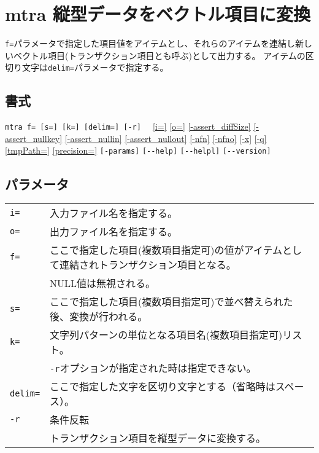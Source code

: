 
%

\section{mtra 縦型データをベクトル項目に変換\label{sect:mtra}}
\verb|f=|パラメータで指定した項目値をアイテムとし、それらのアイテムを連結し新しいベクトル項目(トランザクション項目とも呼ぶ)として出力する。
アイテムの区切り文字は\verb|delim=|パラメータで指定する。

\subsection*{書式}
\verb|mtra f= [s=] [k=] [delim=] [-r]  | 
\hyperref[sect:option_i]{[i=]}
\hyperref[sect:option_o]{[o=]}
\hyperref[sect:option_assert_diffSize]{[-assert\_diffSize]}
\hyperref[sect:option_assert_nullkey]{[-assert\_nullkey]}
\hyperref[sect:option_assert_nullin]{[-assert\_nullin]}
\hyperref[sect:option_assert_nullout]{[-assert\_nullout]}
\hyperref[sect:option_nfn]{[-nfn]} 
\hyperref[sect:option_nfno]{[-nfno]}  
\hyperref[sect:option_x]{[-x]}
\hyperref[sect:option_q]{[-q]}
\hyperref[sect:option_option_tmppath]{[tmpPath=]}
\hyperref[sect:option_precision]{[precision=]}
\verb|[-params]|
\verb|[--help]|
\verb|[--helpl]|
\verb|[--version]|\\

\subsection*{パラメータ}
\begin{table}[htbp]
{\small
\begin{tabular}{ll}
\verb|i=|        & 入力ファイル名を指定する。\\
\verb|o=|        & 出力ファイル名を指定する。\\
\verb|f=|        & ここで指定した項目(複数項目指定可)の値がアイテムとして連結されトランザクション項目となる。\\
                 & NULL値は無視される。\\
\verb|s=|        & ここで指定した項目(複数項目指定可)で並べ替えられた後、変換が行われる。\\
\verb|k=|        & 文字列パターンの単位となる項目名(複数項目指定可)リスト。\\
                 & \verb|-r|オプションが指定された時は指定できない。\\
\verb|delim=|    & ここで指定した文字を区切り文字とする（省略時はスペース）。\\
\verb|-r|        & 条件反転\\
                 & トランザクション項目を縦型データに変換する。\\
\end{tabular} 
}
\end{table} 

